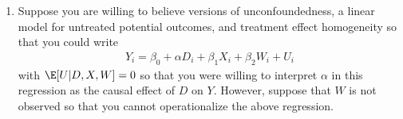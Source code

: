 \documentclass[
  letterpaper,
  DIV=11,
  numbers=noendperiod]{scrreprt}
\begin{document}
\begin{enumerate}
  \begin{enumerate}
  \def\labelenumii{\alph{enumii})}
  \item
    What strategy can use to exploit this institional setting to learn
    about the causal effect of lower college costs on the probability of
    going to college?
  \item
    What sort of data would you need in order to implement this
    strategy?
  \item
    Can you think of any ways that the approach that you suggested could
    go wrong?
  \item
    Another researcher reads the results from the approach you have
    implemented and complains that your results are only specific to
    students who have grades right around the 3.0 cutoff. Is this a fair
    criticism?
  \end{enumerate}
\item
  Suppose you are willing to believe versions of unconfoundedness, a
  linear model for untreated potential outcomes, and treatment effect
  homogeneity so that you could write \begin{align*}
    Y_i = \beta_0 + \alpha D_i + \beta_1 X_i + \beta_2 W_i + U_i
  \end{align*} with \(\E[U|D,X,W] = 0\) so that you were willing to
  interpret \(\alpha\) in this regression as the causal effect of \(D\)
  on \(Y\). However, suppose that \(W\) is not observed so that you
  cannot operationalize the above regression.


\end{enumerate}
\end{document}
